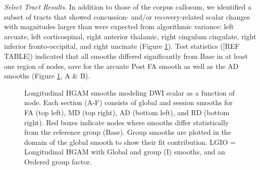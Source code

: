 \documentclass[12pt]{article}
\begin{document}
\textit{Select Tract Results}. In addition to those of the corpus callosum, we identified a subset of tracts that showed concussion- and/or recovery-related scalar changes with magnitudes larger than were expected from algorithmic variance: left arcuate, left corticospinal, right anterior thalamic, right cingulum cingulate, right inferior fronto-occipital, and right uncinate (Figure \ref{fig:lgio-gam-sel}). Test statistics ([REF TABLE]) indicated that all smooths differed significantly from Base in at least one region of nodes, save for the arcuate Post FA smooth as well as the AD smooths (Figure \ref{fig:lgio-gam-sel}, A \& B).

\begin{figure}[H]
	\centering
	\caption{Longitudinal HGAM smooths modeling DWI scalar as a function of node. Each section (A-F) consists of global and session smooths for FA (top left), MD (top right), AD (bottom left), and RD (bottom right). Red boxes indicate nodes where smooths differ statistically from the reference group (Base). Group smooths are plotted in the domain of the global smooth to show their fit contribution. LGIO = Longitudinal HGAM with Global and group (I) smooths, and an Ordered group factor.}
	\label{fig:lgio-gam-sel}
\end{figure}
\end{document}
